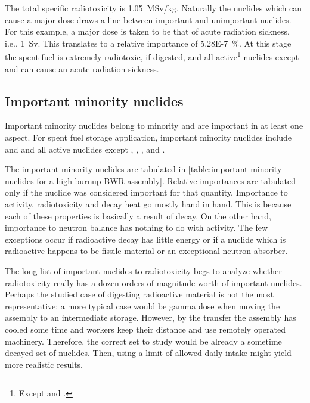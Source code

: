 The total specific radiotoxicity is \SI{1.05}{MSv/kg}. Naturally the nuclides which can cause a major dose draws a line between important and unimportant nuclides. For this example, a major dose is taken to be that of acute radiation sickness, i.e., \SI{1}{Sv}. This translates to a relative importance of \SI{5.28E-7}{\%}. At this stage the spent fuel is extremely radiotoxic, if digested, and all active\footnote{Except  and .} nuclides except  and  can cause an acute radiation sickness.

\subsection{Important minority nuclides}

Important minority nuclides belong to minority and are important in at least one aspect. For spent fuel storage application, important minority nuclides include  and  and all active nuclides except , , ,  and .

The important minority nuclides are tabulated in \autoref{table:important minority nuclides for a high burnup BWR assembly}. Relative importances are tabulated only if the nuclide was considered important for that quantity. Importance to activity, radiotoxicity and decay heat go mostly hand in hand. This is because each of these properties is basically a result of decay. On the other hand, importance to neutron balance has nothing to do with activity. The few exceptions occur if radioactive decay has little energy or if a nuclide which is radioactive happens to be fissile material or an exceptional neutron absorber.

The long list of important nuclides to radiotoxicity begs to analyze whether radiotoxicity really has a dozen orders of magnitude worth of important nuclides. Perhaps the studied case of digesting radioactive material is not the most representative: a more typical case would be gamma dose when moving the assembly to an intermediate storage. However, by the transfer the assembly has cooled some time and workers keep their distance and use remotely operated machinery. Therefore, the correct set to study would be already a sometime decayed set of nuclides. Then, using a limit of allowed daily intake might yield more realistic results.

